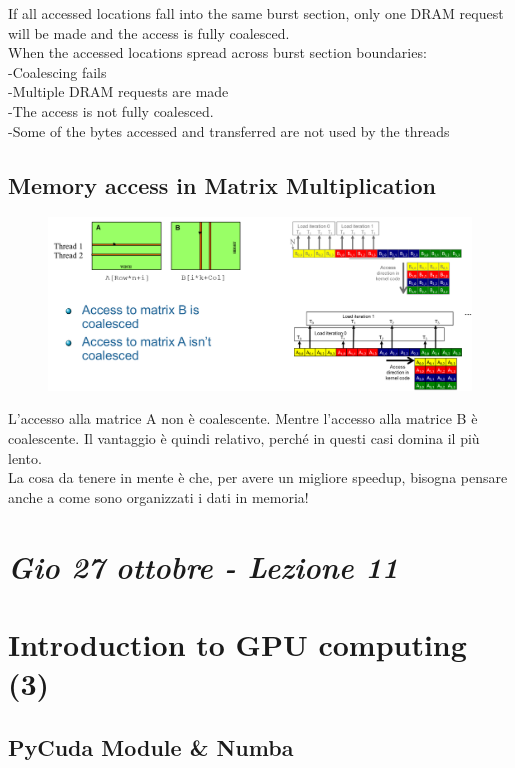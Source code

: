 If all accessed locations fall into the same burst section, only one DRAM request will be made and the access is fully coalesced.\\
When the accessed locations spread across burst section boundaries:\\
-Coalescing fails\\
-Multiple DRAM requests are made\\
-The access is not fully coalesced.\\
-Some of the bytes accessed and transferred are not used by the threads

\subsection{Memory access in Matrix Multiplication}

\begin{figure}[h]
	\centering
	\includegraphics[width=1\textwidth]{figure_parallel/memory_access_mm.png}
\end{figure}
\FloatBarrier

L'accesso alla matrice A non è coalescente. Mentre l'accesso alla matrice B è coalescente. Il vantaggio è quindi relativo, perché in questi casi domina il più lento.\\

La cosa da tenere in mente è che,  per avere un migliore speedup, bisogna pensare anche a come sono organizzati i dati in memoria!

\newpage
\section{\textit{Gio 27 ottobre - Lezione 11}}
\section{Introduction to GPU computing (3)}

\subsection{PyCuda Module \& Numba}

